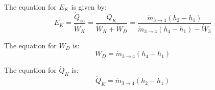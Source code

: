 The equation for \( E_K \) is given by:
\[ E_K = \frac{\dot{Q}_{zu}}{\dot{W}_K} = \frac{\dot{Q}_K}{\dot{W}_K + \dot{W}_D} = \frac{\dot{m}_{3\to4}(h_2 - h_1)}{\dot{m}_{3\to4}(h_4 - h_1) - \dot{W}_3} \]

The equation for \( W_D \) is:
\[ W_D = \dot{m}_{3\to4}(h_4 - h_1) \]

The equation for \( \dot{Q}_K \) is:
\[ \dot{Q}_K = \dot{m}_{3\to4}(h_2 - h_1) \]
